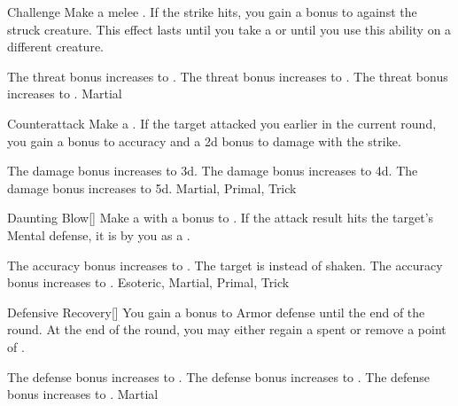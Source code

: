 \lowercase{\hypertarget{maneuver:Challenge}{}}\label{maneuver:Challenge}
\hypertarget{maneuver:Challenge}{}
\begin{freeability}{Challenge}
Make a melee .
If the strike hits, you gain a  bonus to  against the struck creature.
This effect lasts until you take a  or until you use this ability on a different creature.

\rankline
{} The threat bonus increases to .
 The threat bonus increases to .
 The threat bonus increases to .
 Martial
\end{freeability}
\vspace{0.25em}



\lowercase{\hypertarget{maneuver:Counterattack}{}}\label{maneuver:Counterattack}
\hypertarget{maneuver:Counterattack}{}
\begin{apability}{Counterattack}
Make a .
If the target attacked you earlier in the current round, you gain a  bonus to accuracy and a \plus2d bonus to damage with the strike.

\rankline
{} The damage bonus increases to \plus3d.
 The damage bonus increases to \plus4d.
 The damage bonus increases to \plus5d.
 Martial, Primal, Trick
\end{apability}
\vspace{0.25em}



\lowercase{\hypertarget{maneuver:Daunting Blow}{}}\label{maneuver:Daunting Blow}
\hypertarget{maneuver:Daunting Blow}{}
\begin{apability}{Daunting Blow}[]
Make a  with a  bonus to .
If the attack result hits the target's Mental defense,
it is  by you as a .

\rankline
{} The accuracy bonus increases to .
 The target is  instead of shaken.
 The accuracy bonus increases to .
 Esoteric, Martial, Primal, Trick
\end{apability}
\vspace{0.25em}



\lowercase{\hypertarget{maneuver:Defensive Recovery}{}}\label{maneuver:Defensive Recovery}
\hypertarget{maneuver:Defensive Recovery}{}
\begin{freeability}{Defensive Recovery}[]
You gain a  bonus to Armor defense until the end of the round.
At the end of the round, you may either regain a spent  or remove a point of .

\rankline
{} The defense bonus increases to .
 The defense bonus increases to .
 The defense bonus increases to .
 Martial
\end{freeability}
\vspace{0.25em}



